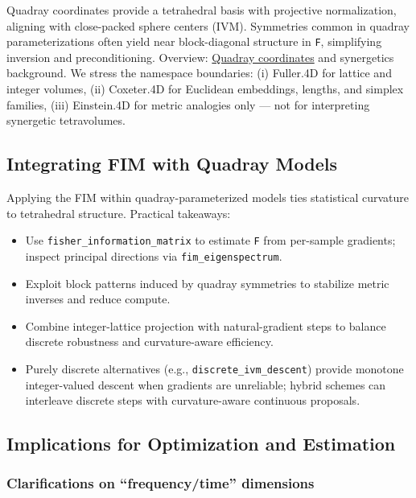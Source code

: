 \documentclass[
  10pt,
]{article}
\providecommand{\tightlist}{%
  \setlength{\itemsep}{0pt}\setlength{\parskip}{0pt}}
\begin{document}
Quadray coordinates provide a tetrahedral basis with projective
normalization, aligning with close-packed sphere centers (IVM).
Symmetries common in quadray parameterizations often yield near
block-diagonal structure in \texttt{F}, simplifying inversion and
preconditioning. Overview:
\href{https://en.wikipedia.org/wiki/Quadray_coordinates}{Quadray
coordinates} and synergetics background. We stress the namespace
boundaries: (i) Fuller.4D for lattice and integer volumes, (ii)
Coxeter.4D for Euclidean embeddings, lengths, and simplex families,
(iii) Einstein.4D for metric analogies only --- not for interpreting
synergetic tetravolumes.

\hypertarget{integrating-fim-with-quadray-models}{%
\subsection{Integrating FIM with Quadray
Models}\label{integrating-fim-with-quadray-models}}

Applying the FIM within quadray-parameterized models ties statistical
curvature to tetrahedral structure. Practical takeaways:

\begin{itemize}
\tightlist
\item
  Use \texttt{fisher\_information\_matrix} to estimate \texttt{F} from
  per-sample gradients; inspect principal directions via
  \texttt{fim\_eigenspectrum}.
\item
  Exploit block patterns induced by quadray symmetries to stabilize
  metric inverses and reduce compute.
\item
  Combine integer-lattice projection with natural-gradient steps to
  balance discrete robustness and curvature-aware efficiency.
\item
  Purely discrete alternatives (e.g., \texttt{discrete\_ivm\_descent})
  provide monotone integer-valued descent when gradients are unreliable;
  hybrid schemes can interleave discrete steps with curvature-aware
  continuous proposals.
\end{itemize}

\hypertarget{implications-for-optimization-and-estimation}{%
\subsection{Implications for Optimization and
Estimation}\label{implications-for-optimization-and-estimation}}

\hypertarget{clarifications-on-frequencytime-dimensions}{%
\subsubsection{Clarifications on ``frequency/time''
dimensions}\label{clarifications-on-frequencytime-dimensions}}
\end{document}
